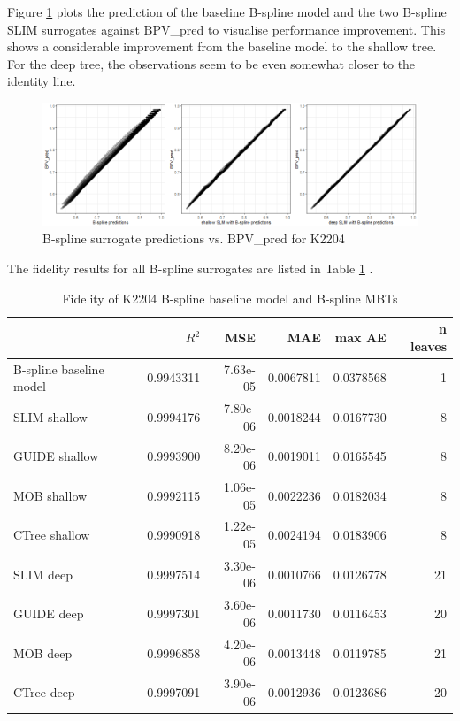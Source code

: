 Figure \ref{fig:ins_k2204_fit} plots the prediction of the baseline B-spline model and the two B-spline SLIM surrogates against BPV\_pred to visualise performance improvement. This shows a considerable improvement from the baseline model to the shallow tree. For the deep tree, the observations seem to be even somewhat closer to the identity line. 

\begin{figure}[!htb]
    \centering    
    \includegraphics[width = 14cm]{Figures/insurance_use_case/k2204_BPV/fit.png}
    \caption{B-spline surrogate predictions vs. BPV\_pred for K2204}
    \label{fig:ins_k2204_fit}
\end{figure}

The fidelity results for all B-spline surrogates are listed in Table \ref{tab:ins_k2204_bsplines_surrogates_perf} .

\begin{table}
\centering \scriptsize
\begin{tabular}[t]{l|r|r|r|r|r}
\hline
  & $R^2$ & MSE & MAE & max AE & n leaves\\
\hline
B-spline baseline model & 0.9943311 & 7.63e-05 & 0.0067811 & 0.0378568 & 1\\
\hline
SLIM shallow & 0.9994176 & 7.80e-06 & 0.0018244 & 0.0167730 & 8\\
GUIDE shallow & 0.9993900 & 8.20e-06 & 0.0019011 & 0.0165545 & 8\\
MOB shallow & 0.9992115 & 1.06e-05 & 0.0022236 & 0.0182034 & 8\\
CTree shallow & 0.9990918 & 1.22e-05 & 0.0024194 & 0.0183906 & 8\\
\hline
SLIM deep & 0.9997514 & 3.30e-06 & 0.0010766 & 0.0126778 & 21\\
GUIDE deep & 0.9997301 & 3.60e-06 & 0.0011730 & 0.0116453 & 20\\
MOB deep & 0.9996858 & 4.20e-06 & 0.0013448 & 0.0119785 & 21\\
CTree deep & 0.9997091 & 3.90e-06 & 0.0012936 & 0.0123686 & 20\\
\hline
\end{tabular}
\label{tab:ins_k2204_bsplines_surrogates_perf}
\caption{Fidelity of K2204 B-spline baseline model and  B-spline MBTs}
\end{table}


